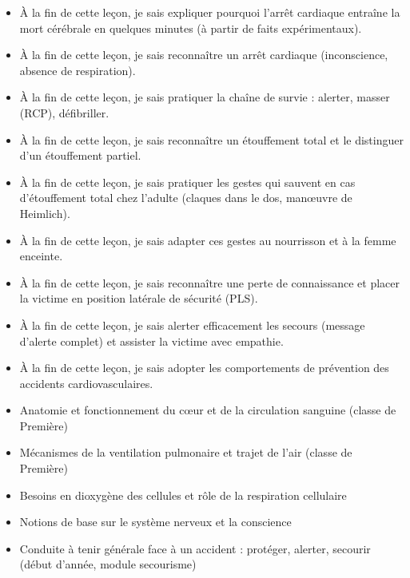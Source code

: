 \documentclass[11pt]{article}
\begin{document}
\begin{objectifs}
\begin{itemize}
\item À la fin de cette leçon, je sais expliquer pourquoi l'arrêt cardiaque entraîne la mort cérébrale en quelques minutes (à partir de faits expérimentaux).
\item À la fin de cette leçon, je sais reconnaître un arrêt cardiaque (inconscience, absence de respiration).
\item À la fin de cette leçon, je sais pratiquer la chaîne de survie : alerter, masser (RCP), défibriller.
\item À la fin de cette leçon, je sais reconnaître un étouffement total et le distinguer d'un étouffement partiel.
\item À la fin de cette leçon, je sais pratiquer les gestes qui sauvent en cas d'étouffement total chez l'adulte (claques dans le dos, manœuvre de Heimlich).
\item À la fin de cette leçon, je sais adapter ces gestes au nourrisson et à la femme enceinte.
\item À la fin de cette leçon, je sais reconnaître une perte de connaissance et placer la victime en position latérale de sécurité (PLS).
\item À la fin de cette leçon, je sais alerter efficacement les secours (message d'alerte complet) et assister la victime avec empathie.
\item À la fin de cette leçon, je sais adopter les comportements de prévention des accidents cardiovasculaires.
\end{itemize}
\end{objectifs}

\begin{prerequis}
\begin{itemize}
\item Anatomie et fonctionnement du cœur et de la circulation sanguine (classe de Première)
\item Mécanismes de la ventilation pulmonaire et trajet de l'air (classe de Première)
\item Besoins en dioxygène des cellules et rôle de la respiration cellulaire
\item Notions de base sur le système nerveux et la conscience
\item Conduite à tenir générale face à un accident : protéger, alerter, secourir (début d'année, module secourisme)
\end{itemize}
\end{prerequis}
\end{document}
